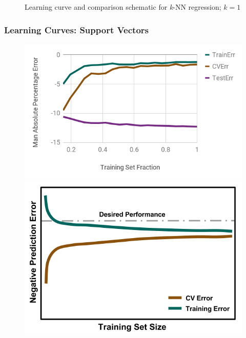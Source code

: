 \begin{frame}
\begin{figure}
\begin{minipage}{0.35\textwidth}
    \end{minipage}
    \caption{Learning curve and comparison schematic for \textit{k}-NN regression; $k=1$}
  \end{figure}
\end{frame}

\begin{frame}
  \frametitle{Learning Curves: Support Vectors}
  \begin{figure}
    \begin{minipage}{0.65\textwidth}
      \centering
      \includegraphics[width=\linewidth]{./figures/svr-learn.png}
    \end{minipage}%
    \begin{minipage}{0.35\textwidth}
      \centering
      \includegraphics[width=\linewidth]{./figures/NegLearningCurve-ideal.png}

\end{minipage}
\end{figure}
\end{frame}
